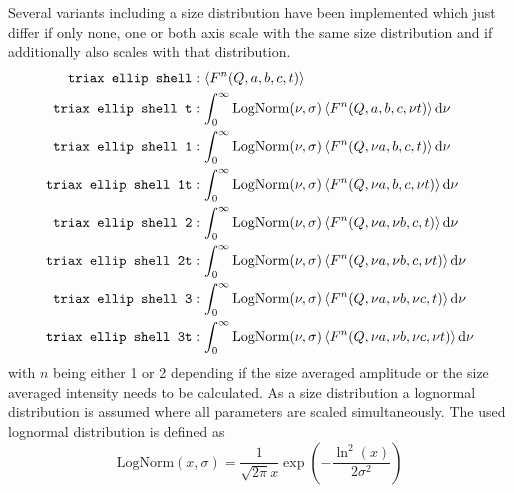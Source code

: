 Several variants including a size distribution have been implemented which just differ if only none, one or both axis scale with the same size distribution and if additionally also scales with that distribution.
\begin{align*}
\text{\texttt{triax ellip shell}}     &:                                            \left\langle F^n(Q,    a,    b,    c,    t)\right\rangle\\
\text{\texttt{triax ellip shell t}}   &: \int_0^\infty \mathrm{LogNorm}(\nu,\sigma) \left\langle F^n(Q,    a,    b,    c,\nu t)\right\rangle \mathrm{d}\nu\\
\text{\texttt{triax ellip shell 1}}   &: \int_0^\infty \mathrm{LogNorm}(\nu,\sigma) \left\langle F^n(Q,\nu a,    b,    c,    t)\right\rangle \mathrm{d}\nu\\
\text{\texttt{triax ellip shell 1t}}  &: \int_0^\infty \mathrm{LogNorm}(\nu,\sigma) \left\langle F^n(Q,\nu a,    b,    c,\nu t)\right\rangle \mathrm{d}\nu\\
\text{\texttt{triax ellip shell 2}}   &: \int_0^\infty \mathrm{LogNorm}(\nu,\sigma) \left\langle F^n(Q,\nu a,\nu b,    c,    t)\right\rangle \mathrm{d}\nu\\
\text{\texttt{triax ellip shell 2t}}  &: \int_0^\infty \mathrm{LogNorm}(\nu,\sigma) \left\langle F^n(Q,\nu a,\nu b,    c,\nu t)\right\rangle \mathrm{d}\nu\\
\text{\texttt{triax ellip shell 3}}   &: \int_0^\infty \mathrm{LogNorm}(\nu,\sigma) \left\langle F^n(Q,\nu a,\nu b,\nu c,    t)\right\rangle \mathrm{d}\nu\\
\text{\texttt{triax ellip shell 3t}}  &: \int_0^\infty \mathrm{LogNorm}(\nu,\sigma) \left\langle F^n(Q,\nu a,\nu b,\nu c,\nu t)\right\rangle \mathrm{d}\nu
\end{align*}
with $n$ being either 1 or 2 depending if the size averaged amplitude or the size averaged intensity needs to be calculated. As a size distribution a lognormal distribution is assumed where all parameters are scaled simultaneously. The used lognormal distribution is defined as
$$
\mathrm{LogNorm}(x,\sigma) = \frac{1}{\sqrt{2\pi}x} \exp\left(-\frac{\ln^2(x)}{2\sigma^2}\right)
$$

